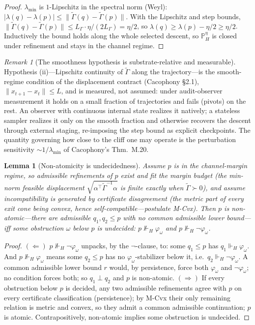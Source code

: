 \documentclass[11pt]{article}
\newtheorem{lemma}{Lemma}
\theoremstyle{definition}
\theoremstyle{remark}
\newtheorem*{remark}{Remark}
\newcommand{\forcesH}{\Vdash_{H}}
\newcommand{\PHeta}{\mathbb{P}_{H}^{\eta}}
\newcommand{\refines}{\leq}
\newcommand{\Gam}{\tilde{\Gamma}}
\newcommand{\lmin}{\lambda_{\min}}
\begin{document}
\begin{proof}
$\lmin$ is $1$-Lipschitz in the spectral norm (Weyl): $|\lambda(q)-\lambda(p)|\le\|\Gam(q)-\Gam(p)\|$.
With the Lipschitz and step bounds, $\|\Gam(q)-\Gam(p)\|\le L_\Gamma\cdot\eta/(2L_\Gamma)=\eta/2$,
so $\lambda(q)\ge\lambda(p)-\eta/2\ge\eta/2$. Inductively the bound holds along the whole selected
descent, so $\PHeta$ is closed under refinement and stays in the channel regime.
\end{proof}

\begin{remark}[The smoothness hypothesis is substrate-relative and measurable]
Hypothesis (ii)---Lipschitz continuity of $\Gam$ along the trajectory---is the smooth-regime condition
of the displacement contract (Cacophony \S2.1), $\|x_{t+1}-x_t\|\le L$, and is measured, not assumed:
under audit-observer measurement it holds on a small fraction of trajectories and fails (pivots) on
the rest. An observer with continuous internal state realizes it natively; a stateless sampler
realizes it only on the smooth fraction and otherwise recovers the descent through external staging,
re-imposing the step bound as explicit checkpoints. The quantity governing how close to the cliff one
may operate is the perturbation sensitivity $\sim 1/\lmin$ of Cacophony's Thm.~M.20.
\end{remark}

\begin{lemma}[Non-atomicity is undecidedness]\label{lem:nonatom}
Assume $p$ is in the channel-margin regime, so admissible refinements of $p$ exist and fit the
margin budget (the min-norm feasible displacement $\sqrt{\alpha^{\top}\Gam^{-1}\alpha}$ is finite
exactly when $\Gam\succ0$), and assume incompatibility is generated by certificate disagreement (the
metric part of every exit cone being convex, hence self-compatible---postulate M-Cvx). Then $p$ is
\emph{non-atomic}---there are admissible $q_1,q_2\refines p$ with no common admissible lower
bound---iff some obstruction $\omega$ below $p$ is \emph{undecided}: $p\not\forcesH\varphi_\omega$ and
$p\not\forcesH\neg\varphi_\omega$.
\end{lemma}

\begin{proof}
$(\Leftarrow)$ $p\not\forcesH\neg\varphi_\omega$ unpacks, by the $\neg$-clause, to: some $q_1\refines
p$ has $q_1\forcesH\varphi_\omega$. And $p\not\forcesH\varphi_\omega$ means some $q_2\refines p$ has
no $\varphi_\omega$-stabilizer below it, i.e.\ $q_2\forcesH\neg\varphi_\omega$. A common admissible
lower bound $r$ would, by persistence, force both $\varphi_\omega$ and $\neg\varphi_\omega$; no
condition forces both; so $q_1\perp q_2$ and $p$ is non-atomic. $(\Rightarrow)$ If every obstruction
below $p$ is decided, any two admissible refinements agree with $p$ on every certificate
classification (persistence); by M-Cvx their only remaining relation is metric and convex, so they
admit a common admissible continuation; $p$ is atomic. Contrapositively, non-atomic implies some
obstruction is undecided.
\end{proof}
\end{document}
